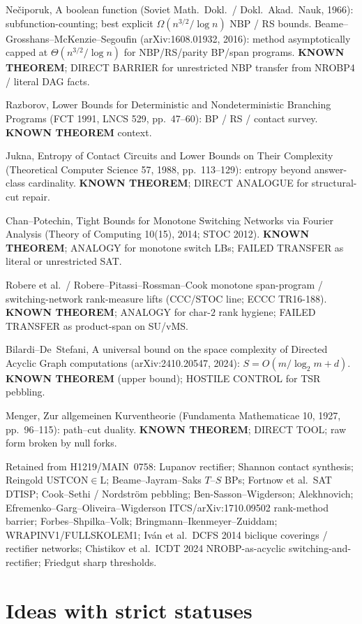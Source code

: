 \documentclass[11pt]{article}
\begin{document}
Ne\v{c}iporuk, A boolean function (Soviet Math.\ Dokl.\ / Dokl.\ Akad.\ Nauk, 1966):
subfunction-counting; best explicit $\Omega(n^{3/2}/\log n)$ NBP / RS bounds.
Beame--Grosshans--McKenzie--Segoufin (arXiv:1608.01932, 2016): method asymptotically
capped at $\Theta(n^{3/2}/\log n)$ for NBP/RS/parity BP/span programs.
\textbf{KNOWN THEOREM}; DIRECT BARRIER for unrestricted NBP transfer from NROBP4 /
literal DAG facts.

Razborov, Lower Bounds for Deterministic and Nondeterministic Branching Programs
(FCT 1991, LNCS 529, pp.~47--60): BP / RS / contact survey. \textbf{KNOWN THEOREM} context.

Jukna, Entropy of Contact Circuits and Lower Bounds on Their Complexity
(Theoretical Computer Science 57, 1988, pp.~113--129): entropy beyond answer-class
cardinality. \textbf{KNOWN THEOREM}; DIRECT ANALOGUE for structural-cut repair.

Chan--Potechin, Tight Bounds for Monotone Switching Networks via Fourier Analysis
(Theory of Computing 10(15), 2014; STOC 2012). \textbf{KNOWN THEOREM}; ANALOGY for
monotone switch LBs; FAILED TRANSFER as literal or unrestricted SAT.

Robere et al.\ / Robere--Pitassi--Rossman--Cook monotone span-program / switching-network
rank-measure lifts (CCC/STOC line; ECCC TR16-188). \textbf{KNOWN THEOREM}; ANALOGY for
char-$2$ rank hygiene; FAILED TRANSFER as product-span on SU/vMS.

Bilardi--De~Stefani, A universal bound on the space complexity of Directed Acyclic Graph
computations (arXiv:2410.20547, 2024): $S=O(m/\log_2 m+d)$. \textbf{KNOWN THEOREM}
(upper bound); HOSTILE CONTROL for TSR pebbling.

Menger, Zur allgemeinen Kurventheorie (Fundamenta Mathematicae 10, 1927, pp.~96--115):
path--cut duality. \textbf{KNOWN THEOREM}; DIRECT TOOL; raw form broken by null forks.

Retained from H1219/MAIN~0758: Lupanov rectifier; Shannon contact synthesis;
Reingold USTCON$\in$L; Beame--Jayram--Saks $T$--$S$ BPs; Fortnow et al.\ SAT DTISP;
Cook--Sethi / Nordstr\"om pebbling; Ben-Sasson--Wigderson; Alekhnovich;
Efremenko--Garg--Oliveira--Wigderson ITCS/arXiv:1710.09502 rank-method barrier;
Forbes--Shpilka--Volk; Bringmann--Ikenmeyer--Zuiddam; WRAPINV1/FULLSKOLEM1;
Iv\'an et al.\ DCFS 2014 biclique coverings / rectifier networks;
Chistikov et al.\ ICDT 2024 NROBP-as-acyclic switching-and-rectifier;
Friedgut sharp thresholds.

\section*{Ideas with strict statuses}
\end{document}
